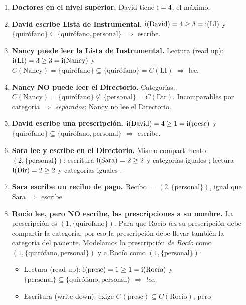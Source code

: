 \begin{enumerate}[leftmargin=1.9em]
  \item \textbf{Doctores en el nivel superior.} David tiene $\mathrm{i}=4$, el máximo. \checkmark
  \item \textbf{David escribe Lista de Instrumental.} $\mathrm{i}(\text{David})=4 \ge 3=\mathrm{i}(\text{LI})$
        y $\{\text{quirófano}\}\subseteq\{\text{quirófano},\text{personal}\}$ $\Rightarrow$
        escribe. \checkmark
  \item \textbf{Nancy puede leer la Lista de Instrumental.} Lectura (read up):
        $\mathrm{i}(\text{LI})=3 \ge 3=\mathrm{i}(\text{Nancy})$ y
        $C(\text{Nancy})=\{\text{quirófano}\}\subseteq\{\text{quirófano}\}=C(\text{LI})$
        $\Rightarrow$ lee. \checkmark
  \item \textbf{Nancy NO puede leer el Directorio.} Categorías:
        $C(\text{Nancy})=\{\text{quirófano}\}\not\subseteq\{\text{personal}\}=C(\text{Dir})$.
        Incomparables por categoría $\Rightarrow$ \emph{separados}: Nancy no lee el Directorio.
        \checkmark
  \item \textbf{David escribe una prescripción.} $\mathrm{i}(\text{David})=4 \ge 1=\mathrm{i}(\text{presc})$
        y $\{\text{quirófano}\}\subseteq\{\text{quirófano},\text{personal}\}$ $\Rightarrow$
        escribe. \checkmark
  \item \textbf{Sara lee y escribe en el Directorio.} Mismo compartimento
        $(2,\{\text{personal}\})$: escritura $\mathrm{i}(\text{Sara})=2\ge 2$ y categorías iguales
        \checkmark; lectura $\mathrm{i}(\text{Dir})=2\ge 2$ y categorías iguales \checkmark.
  \item \textbf{Sara escribe un recibo de pago.} Recibo $=(2,\{\text{personal}\})$, igual que
        Sara $\Rightarrow$ escribe. \checkmark
  \item \textbf{Rocío lee, pero NO escribe, las prescripciones a su nombre.} La prescripción es
        $(1,\{\text{quirófano}\})$. Para que Rocío \emph{lea} su prescripción debe compartir la
        categoría; por eso la prescripción debe llevar también la categoría del paciente. Modelamos
        la prescripción \emph{de Rocío} como $(1,\{\text{quirófano},\text{personal}\})$ y a Rocío
        como $(1,\{\text{personal}\})$:
        \begin{itemize}
          \item Lectura (read up): $\mathrm{i}(\text{presc})=1\ge 1=\mathrm{i}(\text{Rocío})$ y
                $\{\text{personal}\}\subseteq\{\text{quirófano},\text{personal}\}$ $\Rightarrow$
                \emph{lee}. \checkmark
          \item Escritura (write down): exige $C(\text{presc})\subseteq C(\text{Rocío})$, pero

\end{itemize}
\end{enumerate}
